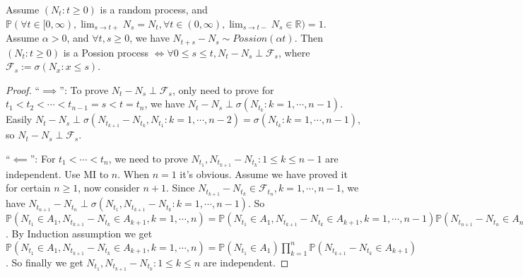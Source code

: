 \documentclass{ctexart}
\newif\ifpreface
\begin{document}
\large
\iffalse
  \setlength{\baselineskip}{1.2em}
  \ifpreface
    
  \else
    \maketitle
  \fi
\fi
{}
\begin{lemma}\label{lem:util}
  Assume \((N_t:t \geq 0)\) is a random process, and \(\mathbb{P}(\forall t \in [0,\infty),\lim_{s \to t+}N_s =N_t,\forall t \in (0,\infty),\lim_{s \to t-}N_s \in \mathbb{R})=1\).
  Assume \(\alpha >0\), and \(\forall t,s \geq 0\), we have \(N_{t + s}-N_s \sim Possion(\alpha t)\).
  Then \((N_t:t \geq 0)\) is a Possion process \(\iff \forall 0 \leq s \leq t,N_t-N_s \perp \mathcal{F}_s\),
  where \(\mathcal{F}_s:=\sigma(N_x:x \leq s)\).
\end{lemma}
\begin{proof}
  ``\(\implies\)'': To prove \(N_t-N_s \perp \mathcal{F}_s\), only need to prove for \(t_1 < t_2 < \cdots <t_{n-1}=s<t=t_n\), we have
  \(N_t-N_s \perp \sigma(N_{t_k}:k=1,\cdots,n-1)\).
  Easily \(N_t-N_s \perp \sigma(N_{t_{k+1}}-N_{t_k},N_{t_1}:k=1,\cdots,n-2)=\sigma(N_{t_k}:k=1,\cdots,n-1)\), so \(N_t-N_s \perp \mathcal{F}_s\).

  ``\(\impliedby\)'': For \(t_1 < \cdots < t_n\), we need to prove \(N_{t_1},N_{t_{k+1}}-N_{t_k}:1 \leq k \leq n-1\) are independent.
  Use MI to \(n\). When \(n=1\) it's obvious.
  Assume we have proved it for certain \(n \geq 1\), now consider \(n+1\).
  Since \(N_{t_{k+1}}-N_{t_k} \in \mathcal{F}_{t_n},k=1,\cdots,n-1\), we have \(N_{t_{n+1}}-N_{t_n} \perp \sigma(N_{t_1},N_{t_{k+1}}-N_{t_k}:k=1,\cdots,n-1)\).
  So \(\mathbb{P}(N_{t_1} \in A_1,N_{t_{k+1}}-N_{t_k} \in A_{k+1},k=1,\cdots,n)=\mathbb{P}(N_{t_1} \in A_1,N_{t_{k+1}}-N_{t_k} \in A_{k+1},k=1,\cdots,n-1)\mathbb{P}(N_{t_{n+1}}-N_{t_n} \in A_{n+1})\).
  By Induction assumption we get \(\mathbb{P}(N_{t_1} \in A_1,N_{t_{k+1}}-N_{t_k} \in A_{k+1},k=1,\cdots,n)=\mathbb{P}(N_{t_1}\in A_1) \prod_{k=1}^{n}\mathbb{P}(N_{t_{k+1}}-N_{t_k} \in A_{k+1})\).
  So finally we get \(N_{t_1},N_{t_{k+1}}-N_{t_k}:1 \leq k \leq n\) are independent.
\end{proof}
\end{document}
